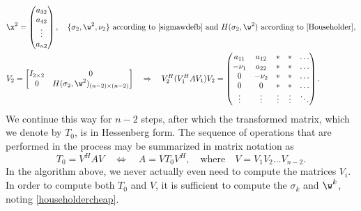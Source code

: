 \begin{align*}
    &\x^{2}=\begin{pmatrix} a_{32} \\ a_{42} \\ \vdots \\ a_{n2} \end{pmatrix}, \quad
    \textrm{$\{\sigma_{2},\w^{2},\nu_{2}\}$ according to \eqref{sigmawdefb} and $H(\sigma_{2},\w^{2})$
    according to \eqref{Householder},}\\
    &V_{2}=\begin{bmatrix} I_{2\times 2} & 0 \\ 0 & H(\sigma_{2},\w^{2})_{(n-2)\times (n-2)} \end{bmatrix}
    \quad \Rightarrow \quad
    V_{2}^{H}(V_{1}^{H}A V_{1})V_{2}=\begin{pmatrix} a_{11} & a_{12} & * & * & \hdots \\
				      -\nu_{1}   & a_{22} & * & * & \hdots \\
				      0          & -\nu_{2} & * & * & \hdots \\
				      0          & 0 & * & * & \hdots \\
				      \vdots     & \vdots & \vdots & \vdots & \ddots \end{pmatrix}.
\end{align*}
We continue this way for $n-2$ steps, after which the transformed
matrix, which we denote by $T_0$, is in Hessenberg form.  The
sequence of operations that are performed in the process may be
summarized in matrix notation as
\begin{equation*}
    T_0=V^{H} A V \quad \Leftrightarrow \quad A=V T_0 V^{H}, \quad
    \textrm{where} \quad V=V_{1}V_{2}\hdots V_{n-2}.
\end{equation*}
In the algorithm above, we never actually even need to compute the
matrices $V_{i}$.  In order to compute both $T_0$ and $V$, it is
sufficient to compute the $\sigma_{k}$ and $\w^{k}$, noting
\eqref{householdercheap}.

